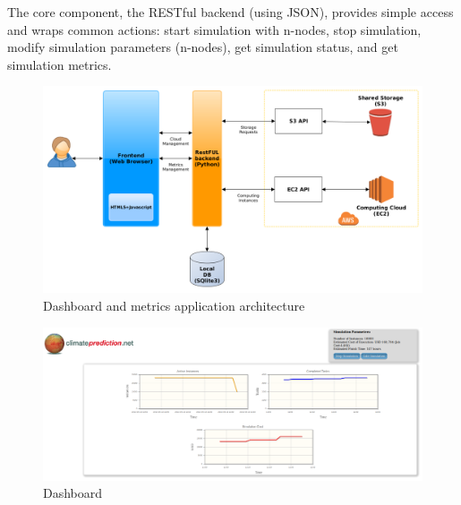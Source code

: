 \documentclass[journal abbreviation, manuscript]{copernicus}
\begin{document}
 The core component, the RESTful backend (using JSON), provides simple access and wraps common actions: start simulation with n-nodes, stop simulation, modify simulation parameters (n-nodes), get simulation status, and get simulation metrics.


\begin{figure}[!h]
\centering
\includegraphics[width=6.5in]{images/dashboard_architecture}
\caption{Dashboard and metrics application architecture}
\label{fig:dashboard_architecture}
\end{figure}

\begin{figure}[!h]
\centering
\includegraphics[width=6.5in]{images/screenshots/gui/dashboard01}
\caption{Dashboard}
\label{fig:dashboard}
\end{figure}
\end{document}
